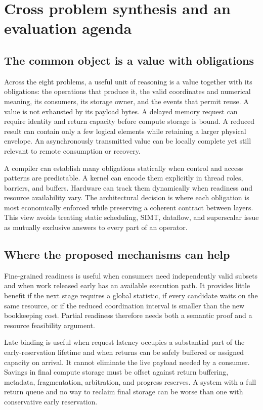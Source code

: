 \section{Cross problem synthesis and an evaluation agenda}
\label{sec:synthesis}

\subsection{The common object is a value with obligations}

Across the eight problems, a useful unit of reasoning is a value together with its obligations: the operations that produce it, the valid coordinates and numerical meaning, its consumers, its storage owner, and the events that permit reuse. A value is not exhausted by its payload bytes. A delayed memory request can require identity and return capacity before compute storage is bound. A reduced result can contain only a few logical elements while retaining a larger physical envelope. An asynchronously transmitted value can be locally complete yet still relevant to remote consumption or recovery.

A compiler can establish many obligations statically when control and access patterns are predictable. A kernel can encode them explicitly in thread roles, barriers, and buffers. Hardware can track them dynamically when readiness and resource availability vary. The architectural decision is where each obligation is most economically enforced while preserving a coherent contract between layers. This view avoids treating static scheduling, SIMT, dataflow, and superscalar issue as mutually exclusive answers to every part of an operator.

\subsection{Where the proposed mechanisms can help}

Fine-grained readiness is useful when consumers need independently valid subsets and when work released early has an available execution path. It provides little benefit if the next stage requires a global statistic, if every candidate waits on the same resource, or if the reduced coordination interval is smaller than the new bookkeeping cost. Partial readiness therefore needs both a semantic proof and a resource feasibility argument.

Late binding is useful when request latency occupies a substantial part of the early-reservation lifetime and when returns can be safely buffered or assigned capacity on arrival. It cannot eliminate the live payload needed by a consumer. Savings in final compute storage must be offset against return buffering, metadata, fragmentation, arbitration, and progress reserves. A system with a full return queue and no way to reclaim final storage can be worse than one with conservative early reservation.

